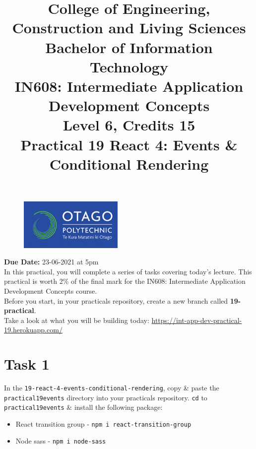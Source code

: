 \documentclass{article}
\author{}
\begin{document}
\begin{figure}
	\centering
	\includegraphics[width=50mm]{./img/logo.png}
\end{figure}

\title{College of Engineering, Construction and Living Sciences\\Bachelor of Information Technology\\IN608: Intermediate Application Development Concepts\\Level 6, Credits 15\\\textbf{Practical 19 React 4: Events \& Conditional Rendering}} 
\date{}
\maketitle

\textbf{Due Date:} 23-06-2021 at 5pm \\

In this practical, you will complete a series of tasks covering today's lecture. This practical is worth 2\% of the final mark for the IN608: Intermediate Application Development Concepts course. \\

Before you start, in your practicals repository, create a new branch called \textbf{19-practical}. \\

Take a look at what you will be building today: \href{https://int-app-dev-practical-19.herokuapp.com/}{https://int-app-dev-practical-19.herokuapp.com/} 

\section*{Task 1} 
In the \texttt{19-react-4-events-conditional-rendering}, copy \& paste the \texttt{practical19events} directory into your practicals repository. \texttt{cd} to \texttt{practical19events} \& install the following package:
\begin{itemize}
  \item React transition group - \texttt{npm i react-transition-group} 
  \item Node sass - \texttt{npm i node-sass}
\end{itemize}
\end{document}
